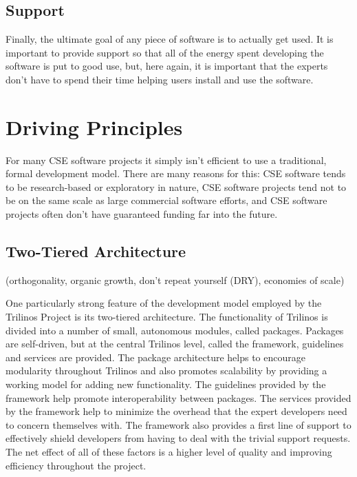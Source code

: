 \documentclass[12pt,relax]{article}
\begin{document}
\subsection{Support}
Finally, the ultimate goal of any piece of software is to actually get used.  
It is important to provide support so that all of the energy spent developing
the software is put to good use, but, here again, it is important that the
experts don't have to spend their time helping users install and use the
software.

\clearpage


\section{Driving Principles}
\label{Section:Driving Principles}

For many CSE software projects it simply isn't efficient to use a traditional, 
formal development model.  There are many reasons for this:  CSE software tends
to be research-based or exploratory in nature, CSE software projects tend not
to be on the same scale as large commercial software efforts, and CSE software 
projects often don't have guaranteed funding far into the future.  

\subsection{Two-Tiered Architecture}

(orthogonality, organic growth, don't repeat yourself (DRY), economies of scale)

One particularly strong feature of the development model employed by the
Trilinos Project is its two-tiered architecture.  The functionality of Trilinos
is divided into a number of small, autonomous modules, called packages. 
Packages are self-driven, but at the central Trilinos level, called the
framework, guidelines and services are provided.  The package architecture
helps to encourage modularity throughout Trilinos and also promotes scalability
by providing a working model for adding new functionality.  The guidelines
provided by the framework help promote interoperability between packages.
The services provided by the framework help to minimize the overhead that the
expert developers need to concern themselves with.  The framework also provides
a first line of support to effectively shield developers from having to deal
with the trivial support requests.  The net effect of all of these factors is
a higher level of quality and improving efficiency throughout the project.
\end{document}
